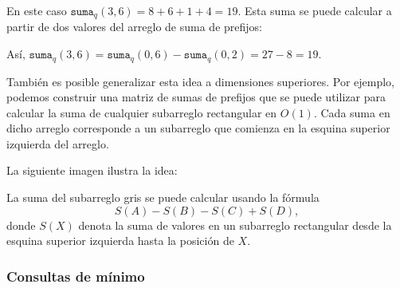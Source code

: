 En este caso $\texttt{suma}_q(3,6)=8+6+1+4=19$.
Esta suma se puede calcular a partir de
dos valores del arreglo de suma de prefijos:
\begin{center}
\end{center}
Así, $\texttt{suma}_q(3,6)=\texttt{suma}_q(0,6)-\texttt{suma}_q(0,2)=27-8=19$.

También es posible generalizar esta idea
a dimensiones superiores.
Por ejemplo, podemos construir una matriz
de sumas de prefijos que se puede utilizar para calcular
la suma de cualquier subarreglo rectangular en $O(1)$.
Cada suma en dicho arreglo corresponde a
un subarreglo que comienza en la esquina superior
izquierda del arreglo.

\pagebreak
La siguiente imagen ilustra la idea:
\begin{center}
\end{center}

La suma del subarreglo gris se puede calcular
usando la fórmula
\[S(A) - S(B) - S(C) + S(D),\]
donde $S(X)$ denota la suma de valores
en un subarreglo rectangular
desde la esquina superior izquierda
hasta la posición de $X$.

\subsubsection{Consultas de mínimo}

